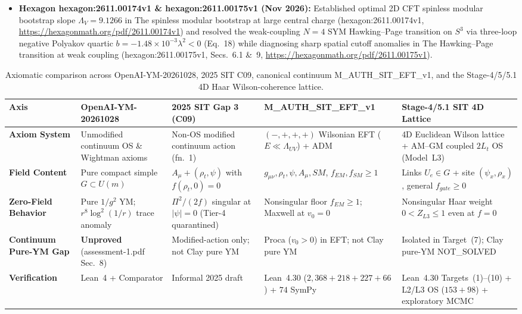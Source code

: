 \documentclass[american,11pt,letterpaper]{article}
\def\mathcal#1{#1}%
\def\mathrm#1{#1}%
\def\texttt#1{#1}%
\def\emph#1{#1}%
\begin{document}
\begin{enumerate}[leftmargin=2em]
\begin{itemize}
    \item \textbf{Hexagon \texttt{hexagon:2611.00174v1} \& \texttt{hexagon:2611.00175v1} (Nov 2026):} Established optimal 2D CFT spinless modular bootstrap slope $\Lambda_V = 9.1266$ in \emph{The spinless modular bootstrap at large central charge} (\texttt{hexagon:2611.00174v1}, \url{https://hexagonmath.org/pdf/2611.00174v1}) and resolved the weak-coupling $\mathcal{N}=4$ SYM Hawking--Page transition on $S^3$ via three-loop negative Polyakov quartic $b = -1.48\times 10^{-3}\lambda^2 < 0$ (Eq.~18) while diagnosing sharp spatial cutoff anomalies in \emph{The Hawking--Page transition at weak coupling} (\texttt{hexagon:2611.00175v1}, Secs.~6.1 \&~9, \url{https://hexagonmath.org/pdf/2611.00175v1}).
  \end{itemize}
\end{enumerate}

\begin{table}[htbp]
\centering
\caption{Axiomatic comparison across \texttt{OpenAI-YM-20261028}, 2025 SIT \texttt{C09}, canonical continuum \texttt{M\_AUTH\_SIT\_EFT\_v1}, and the Stage-4/5/5.1 4D Haar Wilson-coherence lattice.}
\label{tab:2025-vs-2026-axiomatic}
\vspace{0.4em}
\footnotesize
\begin{tabular}{|p{2.2cm}|p{2.9cm}|p{2.7cm}|p{2.9cm}|p{3.0cm}|}
\hline
\textbf{Axis} & \textbf{\texttt{OpenAI-YM-20261028}} & \textbf{2025 SIT \texttt{Gap 3} (\texttt{C09})} & \textbf{\texttt{M\_AUTH\_SIT\_EFT\_v1}} & \textbf{Stage-4/5.1 SIT 4D Lattice} \\
\hline
\textbf{Axiom System} & Unmodified continuum OS \& Wightman axioms & Non-OS modified continuum action (fn.~1) & $(-,+,+,+)$ Wilsonian EFT ($E\ll\Lambda_{\mathrm{UV}}$) + ADM & 4D Euclidean Wilson lattice + AM--GM coupled $2L_t$ OS (Model~L3) \\
\hline
\textbf{Field Content} & Pure compact simple $G \subset U(m)$ & $A_\mu + (\rho_t,\psi)$ with $f(\rho_t,0)=0$ & $g_{\mu\nu},\rho_t,\psi,A_\mu,\mathrm{SM}$, $f_{\mathrm{EM}},f_{\mathrm{SM}}\ge 1$ & Links $U_e\in G$ + site $(\psi_x,\rho_x)$, general $f_{\mathrm{gate}}\ge 0$ \\
\hline
\textbf{Zero-Field Behavior} & Pure $1/g^2$ YM; $r^8\log^2(1/r)$ trace anomaly & $\Pi^2/(2f)$ singular at $|\psi|=0$ (Tier-4 quarantined) & Nonsingular floor $f_{\mathrm{EM}}\ge 1$; Maxwell at $v_0=0$ & Nonsingular Haar weight $0 < Z_{\mathrm{L3}} \le 1$ even at $f=0$ \\
\hline
\textbf{Continuum Pure-YM Gap} & \textbf{Unproved} (\texttt{assessment-1.pdf} Sec.~8) & Modified-action only; not Clay pure YM & Proca ($v_0>0$) in EFT; not Clay pure YM & Isolated in Target~(7); Clay pure-YM \texttt{NOT\_SOLVED} \\
\hline
\textbf{Verification} & Lean~4 + Comparator & Informal 2025 draft & Lean~4.30 ($2{,}368 + 218 + 227 + 66$) + $74$ SymPy & Lean~4.30 Targets~(1)--(10) + L2/L3 OS ($153+98$) + exploratory MCMC \\
\hline
\end{tabular}
\end{table}
\end{document}
